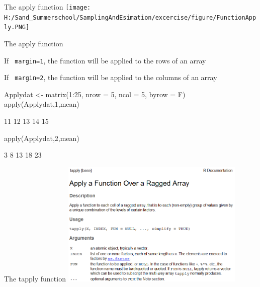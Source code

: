 \documentclass[11pt,german,hideothersubsections]{beamer}
\newcommand{\R}[1]{{\tt \color{blue}  #1}}
\begin{document}
\begin{frame}[fragile]{The apply function}
\texttt{[image: H:/Sand\_Summerschool/SamplingAndEsimation/excercise/figure/FunctionApply.PNG]}
\end{frame}
\begin{frame}[fragile]{The apply function}
\footnotesize{
\begin{itemize}\footnotesize{
\item If \R{margin=1}, the function will be applied to the rows of an array
\item If \R{margin=2}, the function will be applied to the columns of an array
}
\end{itemize}
\vspace{.5cm}
\pause
\begin{Schunk}
\begin{Sinput}
 Applydat <- matrix(1:25, nrow = 5, ncol = 5, byrow = F)
 apply(Applydat,1,mean)
\end{Sinput}
\begin{Soutput}
[1] 11 12 13 14 15
\end{Soutput}
\begin{Sinput}
 apply(Applydat,2,mean)
\end{Sinput}
\begin{Soutput}
[1]  3  8 13 18 23
\end{Soutput}
\end{Schunk}
}
\end{frame}
\begin{frame}[fragile]{The tapply function}
\includegraphics[width=\textwidth, height=6cm]{../figure/FunctionTapply.PNG}
\end{frame}
\end{document}
